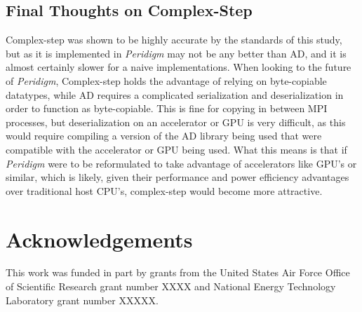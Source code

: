 \documentclass[preprint,12pt]{elsarticle}
\begin{document}
\subsection{Final Thoughts on Complex-Step}
Complex-step was shown to be highly accurate by the standards of this study, but as it is
implemented in \emph{Peridigm} may not be any better than AD, and it is almost certainly slower for
a naive implementations. When looking to the future of \emph{Peridigm}, Complex-step holds the
advantage of relying on byte-copiable datatypes, while AD requires a complicated serialization and
deserialization in order to function as byte-copiable. This is fine for copying in between MPI
processes, but deserialization on an accelerator or GPU is very difficult, as this would require
compiling a version of the AD library being used that were compatible with the accelerator or GPU
being used. What this means is that if \emph{Peridigm} were to be reformulated to take advantage of
accelerators like GPU's or similar, which is likely, given their performance and power efficiency
advantages over traditional host CPU's, complex-step would become more attractive.




\section{Acknowledgements}
This work was funded in part by grants from the United States Air Force Office of Scientific
Research grant number XXXX and National Energy Technology Laboratory grant number XXXXX. 
\label{sec:ack}






\end{document}
